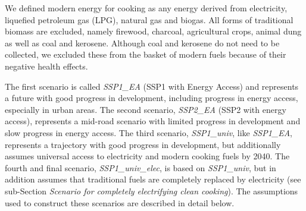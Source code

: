\documentclass[
]{article}
\begin{document}
We defined modern energy for cooking as any energy derived from electricity, liquefied petroleum gas (LPG), natural gas and biogas. All forms of traditional biomass are excluded, namely firewood, charcoal, agricultural crops, animal dung as well as coal and kerosene. Although coal and kerosene do not need to be collected, we excluded these from the basket of modern fuels because of their negative health effects.

The first scenario is called \emph{SSP1\_EA} (SSP1 with Energy Access) and represents a future with good progress in development, including progress in energy access, especially in urban areas. The second scenario, \emph{SSP2\_EA} (SSP2 with energy access), represents a mid-road scenario with limited progress in development and slow progress in energy access. The third scenario, \emph{SSP1\_univ}, like \emph{SSP1\_EA}, represents a trajectory with good progress in development, but additionally assumes universal access to electricity and modern cooking fuels by 2040. The fourth and final scenario, \emph{SSP1\_univ\_elec}, is based on \emph{SSP1\_univ}, but in addition assumes that traditional fuels are completely replaced by electricity (see sub-Section \emph{Scenario for completely electrifying clean cooking}). The assumptions used to construct these scenarios are described in detail below.
\end{document}
